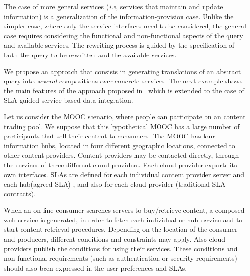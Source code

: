 The case of more general services (\textit{i.e}, services that maintain and update information) is a generalization of the information-provision case.
Unlike the simpler case, where only the service interfaces need to be considered, the general case requires considering the functional and non-functional aspects of the query and available services.
The rewriting process is guided by the specification of both the query to be rewritten and the available services.


We propose an approach that consists in generating translations of an abstract query into \textit{several}  compositions over concrete  services. 
The next example shows the main features of the approach proposed in~\cite{CostaAMR13} which is extended to the case of SLA-guided service-based data integration. 

Let us consider the MOOC scenario, where people can participate on an content trading pool.
We suppose that this hypothetical MOOC has a large number of participants that sell their content  to  consumers. 
The MOOC has four information hubs, located in four different geographic locations, connected to other content providers.
Content providers may be  contacted directly, through the services of three different cloud providers.
Each cloud provider exports its own interfaces.
SLAs are defined for each individual content provider server and  each hub(agreed SLA)  , and also for each cloud provider (traditional SLA contracts). 

When an on-line consumer searches servers to buy/retrieve content, a composed web service is generated, in order to fetch each individual or hub service and to start  content retrieval procedures.
Depending on the location of the consumer and producers, different conditions and constraints may apply.
Also  cloud providers  publish the conditions for using their services.
These conditions and non-functional requirements (such as authentication or security requirements) should also been expressed in the user preferences and SLAs.

